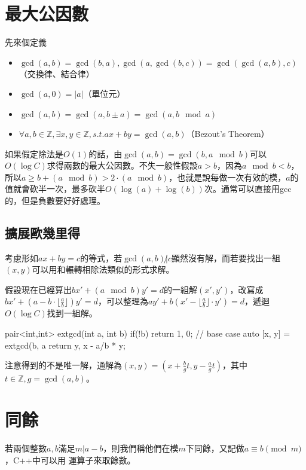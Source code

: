 \documentclass[main.tex]{subfiles}
\begin{document}
\section{最大公因數}
先來個定義

\begin{itemize}
\item $\gcd(a,b) = \gcd(b,a), \gcd(a,\gcd(b,c)) = \gcd(\gcd(a,b), c)$（交換律、結合律）
\item $\gcd(a,0) = |a|$（單位元）
\item $\gcd(a,b) = \gcd(a, b \pm a) = \gcd(a, b \mod a)$
\item $\forall a,b \in \mathbb{Z} , \exists x,y \in \mathbb{Z}, s.t. ax+by = \gcd(a,b)$（Bezout's Theorem）
\end{itemize}

如果假定除法是$O(1)$的話，由$\gcd(a,b)=\gcd(b,a \mod b)$可以$O(\log C)$求得兩數的最大公因數。不失一般性假設$a>b$，因為$a \mod b < b$，所以$a \geq b+(a \mod b) > 2\cdot(a \mod b)$，也就是說每做一次有效的模，$a$的值就會砍半一次，最多砍半$O(\log(a)+\log(b))$次。通常可以直接用gcc的，但是負數要好好處理。

\subsection{擴展歐幾里得}
考慮形如$ax+by=c$的等式，若$\gcd(a,b) {\not |} c$顯然沒有解，而若要找出一組$(x,y)$可以用和輾轉相除法類似的形式求解。

假設現在已經算出$bx' + (a \mod b)y' = d$的一組解$(x', y')$，改寫成$bx' + (a - b \cdot \lfloor \frac{a}{b} \rfloor)y' = d$，可以整理為$ay' + b(x' - \lfloor \frac{a}{b} \rfloor \cdot y') = d$，遞迴$O(\log C)$找到一組解。

\begin{C++}
pair<int,int> extgcd(int a, int b) {
	if(!b) return {1, 0}; // base case
	auto [x, y] = extgcd(b, a%
	return {y, x - a/b * y};
}
\end{C++}
注意得到的不是唯一解，通解為$(x,y) = (x+\frac{b}{g}t, y-\frac{a}{g}t)$，其中$t \in \mathbb{Z}, g=\gcd(a,b)$。

\section{同餘}
若兩個整數$a,b$滿足$m | a-b$，則我們稱他們在模$m$下同餘，又記做$a \equiv b \pmod m$，C++中可以用 \inline{\%} 運算子來取餘數。
\end{document}
